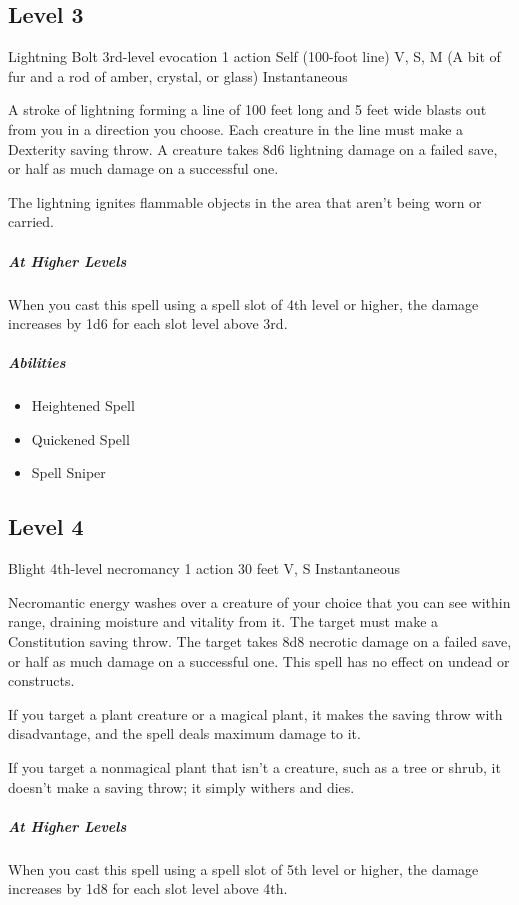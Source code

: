 \documentclass[a4paper,openany,twocolumn]{book}
\begin{document}
\subsection*{Level 3}

\DndSpellHeader
  {Lightning Bolt}
  {3rd-level evocation}
  {1 action}
  {Self (100-foot line)}
  {V, S, M (A bit of fur and a rod of amber, crystal, or glass)}
  {Instantaneous}

A stroke of lightning forming a line of 100 feet long and 5 feet wide blasts out from you in a direction you choose. Each creature in the line must make a Dexterity saving throw. A creature takes 8d6 lightning damage on a failed save, or half as much damage on a successful one.
    
The lightning ignites flammable objects in the area that aren't being worn or carried.
    
\subparagraph*{At Higher Levels} When you cast this spell using a spell slot of 4th level or higher, the damage increases by 1d6 for each slot level above 3rd.

\subparagraph*{Abilities}
\begin{itemize}
  \item Heightened Spell
  \item Quickened Spell
  \item Spell Sniper
\end{itemize}

\subsection*{Level 4}

\DndSpellHeader
  {Blight}
  {4th-level necromancy}
  {1 action}
  {30 feet}
  {V, S}
  {Instantaneous}

Necromantic energy washes over a creature of your choice that you can see within range, draining moisture and vitality from it. The target must make a Constitution saving throw. The target takes 8d8 necrotic damage on a failed save, or half as much damage on a successful one. This spell has no effect on undead or constructs. 
    
If you target a plant creature or a magical plant, it makes the saving throw with disadvantage, and the spell deals maximum damage to it. 
    
If you target a nonmagical plant that isn't a creature, such as a tree or shrub, it doesn't make a saving throw; it simply withers and dies.
    
\subparagraph*{At Higher Levels} When you cast this spell using a spell slot of 5th level or higher, the damage increases by 1d8 for each slot level above 4th.
\end{document}
